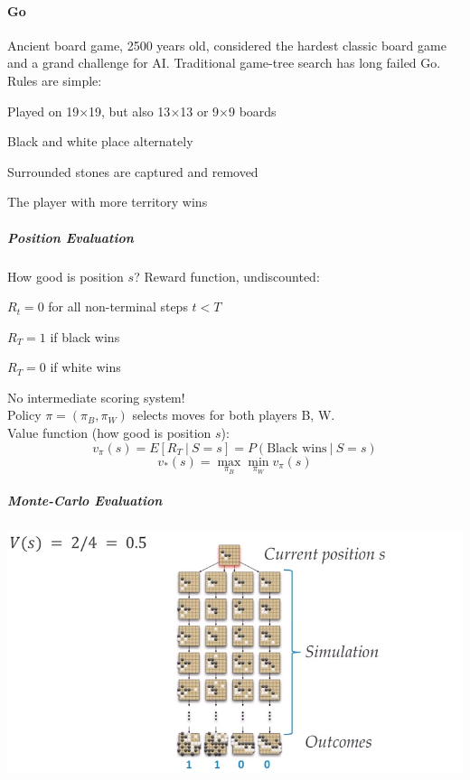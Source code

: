 \documentclass[10pt]{report}
\begin{document}
\paragraph{Go} Ancient board game, 2500 years old, considered the hardest classic board game and a grand challenge for AI. Traditional game-tree search has long failed Go.\\
Rules are simple:
\begin{list}{}{}
	\item Played on 19$\times$19, but also 13$\times$13 or 9$\times$9 boards
	\item Black and white place alternately
	\item Surrounded stones are captured and removed
	\item The player with more territory wins
\end{list}
\subparagraph{Position Evaluation} How good is position $s$? Reward function, undiscounted:
\begin{list}{}{}
	\item $R_t = 0$ for all non-terminal steps $t<T$
	\item $R_T = 1$ if black wins
	\item $R_T = 0$ if white wins
\end{list}
No intermediate scoring system!\\
Policy $\pi=(\pi_B,\pi_W)$ selects moves for both players B, W.\\
Value function (how good is position $s$):
$$v_\pi(s) = E[R_T\:|\:S=s] = P(\text{Black wins}\:|\:S=s)$$
$$v_*(s) = \max_{\pi_B}\min_{\pi_W} v_\pi(s)$$
\subparagraph{Monte-Carlo Evaluation}
\begin{center}
	\includegraphics[scale=0.5]{187.png} %
\end{center}
\end{document}

